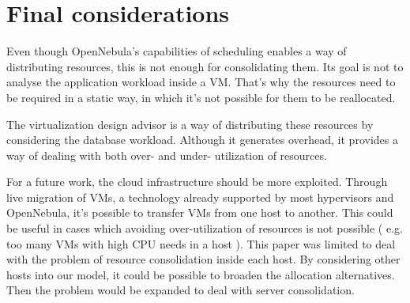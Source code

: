 \chapter{\textbf{Final considerations}}

Even though OpenNebula's capabilities of scheduling enables a way of distributing resources, this is not enough for consolidating them. Its goal is not to analyse the application workload inside a VM. That's why the resources need to be required in a static way, in which it's not possible for them to be reallocated.

The virtualization design advisor is a way of distributing these resources by considering the database workload. Although it generates overhead, it provides a way of dealing with both over- and under- utilization of resources. 


For a future work, the cloud infrastructure should be more exploited. Through live migration of VMs, a technology already supported by most hypervisors and OpenNebula, it's possible to transfer VMs from one host to another. This could be useful in cases which avoiding over-utilization of resources is not possible ( e.g. too many VMs with high CPU needs in a host ). This paper was limited to deal with the problem of resource consolidation inside each host. By considering other hosts into our model, it could be possible to broaden the allocation alternatives. Then the problem would be expanded to deal with server consolidation.